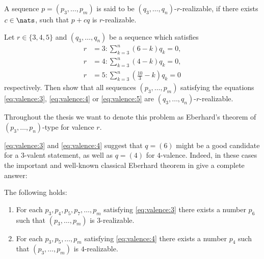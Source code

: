 \begin{definition}\label{def:eberhard:realizable}
  A sequence $p = (p_3, \dots, p_m)$ is said to be $(q_3, \dots, q_n)$-$r$-realizable, if there exists $c \in \nats$, such that $p + c q$ is $r$-realizable.
\end{definition}
\begin{problem}\label{problem:eberhard}
  Let $r \in \{3, 4, 5\}$ and $(q_3, \dots, q_n)$ be a sequence which satisfies
  \begin{align}
    r &= 3: \sum_{k=3}^n \left( 6            - k \right) q_k = 0 \label{eq:zero:curv:3},\\
    r &= 4: \sum_{k=3}^n \left( 4            - k \right) q_k = 0 \label{eq:zero:curv:4},\\
    r &= 5: \sum_{k=3}^n \left( \frac{10}{3} - k \right) q_k = 0 \label{eq:zero:curv:5}
  \end{align}
  respectively. Then show that all sequences $(p_3, \dots, p_m)$ satisfying the equations \ref{eq:valence:3}, \ref{eq:valence:4} or \ref{eq:valence:5} are $(q_3, \dots, q_n)$-$r$-realizable.
\end{problem}
\begin{notation}
  Throughout the thesis we want to denote this problem as Eberhard's theorem of $(p_3, \dots, p_n)$-type for valence $r$.
\end{notation}
\autoref{eq:valence:3} and \autoref{eq:valence:4} suggest that $q = (6)$ might be a good candidate for a $3$-valent statement, as well as $q = (4)$ for $4$-valence. Indeed, in these cases the important and well-known classical Eberhard theorem in \cite{ConvexPolytopes} give a complete answer:
\renewcommand{\Itemautorefname}{Theorem \ref{thm:eberhard}}
\begin{theorem} \label{thm:eberhard} The following holds:
  \begin{enumerate}[label=(\roman*)]
  \item \label{thm:eberhard:3} For each $p_3, p_4, p_5, p_7, \dots, p_m$ satisfying \autoref{eq:valence:3} there exists a number $p_6$ such that $(p_3, \dots, p_m)$ is $3$-realizable.
  \item \label{thm:eberhard:4} For each $p_3, p_5, \dots, p_m$ satisfying \autoref{eq:valence:4} there exists a number $p_4$ such that $(p_3, \dots, p_m)$ is $4$-realizable.
  \end{enumerate}
\end{theorem}

